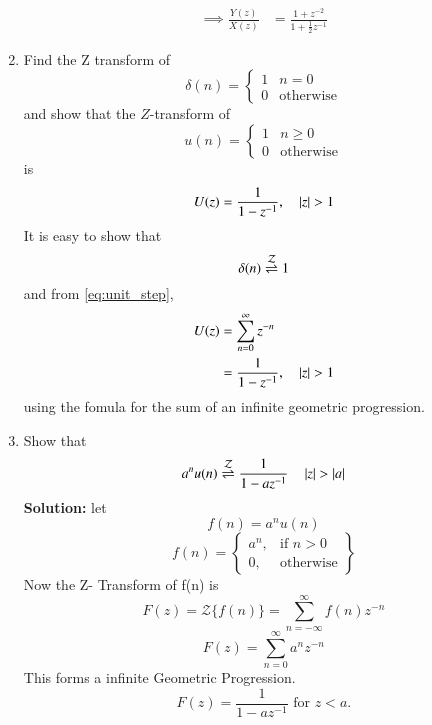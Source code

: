 \documentclass[journal,12pt,twocolumn]{IEEEtran}
\renewcommand\thesection{\arabic{section}}
\begin{document}
\begin{enumerate}[label=\thesection.\arabic*]
\begin{align}
\implies \frac{Y(z)}{X(z)} &= \frac{1 + z^{-2}}{1 + \frac{1}{2}z^{-1}}
\label{eq:freq_resp}
\end{align}
%
\item Find the Z transform of 
\begin{equation}
\delta(n)
=
\begin{cases}
1 & n = 0
\\
0 & \text{otherwise}
\end{cases}
\end{equation}
and show that the $Z$-transform of
\begin{equation}
\label{eq:unit_step}
u(n)
=
\begin{cases}
1 & n \ge 0
\\
0 & \text{otherwise}
\end{cases}
\end{equation}
is
\begin{equation}
U(z) = \frac{1}{1-z^{-1}}, \quad \left\vert z\right\vert > 1
\end{equation}
\solution It is easy to show that
\begin{equation}
\delta(n) \overset{\mathcal{Z}}{ \rightleftharpoons} 1
\end{equation}
and from \eqref{eq:unit_step},
\begin{align}
U(z) &= \sum _{n= 0}^{\infty}z^{-n}
\\
&=\frac{1}{1-z^{-1}}, \quad \left\vert z\right\vert > 1
\end{align}
using the fomula for the sum of an infinite geometric progression.
%
\item Show that 
\begin{equation}
\label{eq:anun}
a^nu(n) \overset{\mathcal{Z}}{ \rightleftharpoons} \frac{1}{1-az^{-1}} \quad \left\vert z\right\vert > \left\vert a\right\vert
\end{equation}
\solution
\textbf{Solution: }
let
\begin{equation}
    f(n) = a^n u(n)
\end{equation}
\begin{equation}
f(n) = 
\left\{
    \begin{array}{lr}
        a^n, & \text{if } n>0\\
        0  , & \text{otherwise}
    \end{array}
\right\}
\end{equation}
Now the Z- Transform of f(n) is
\begin{equation}
    F(z) = {\mathcal {Z}}\{f(n)\} = \sum_{n=-\infty}^{\infty} f(n)z^{-n}
\end{equation}
\begin{equation}
    F(z) = \sum_{n=0}^{\infty} a^{n}z^{-n}
\end{equation}
This forms a infinite Geometric Progression.
\begin{equation}
    F(z) = \frac{1}{1-az^{-1}} \text{ for } z<a.
\end{equation}


\end{enumerate}
\end{document}

